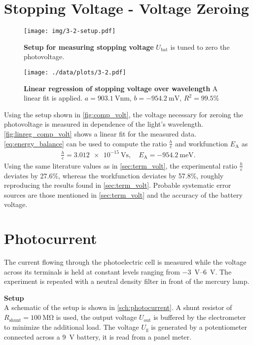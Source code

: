 \section{Stopping Voltage - Voltage Zeroing}%
\begin{figure}[tbp]
	\centering
	\texttt{[image: img/3-2-setup.pdf]}
	\caption[Setup for measuring stopping voltage]{\textbf{Setup for measuring stopping voltage} $U_\text{bat}$ is tuned to zero the photovoltage.}
	\label{fig:comp_volt}
\end{figure}
\begin{figure}[tbp]
	\centering
	\texttt{[image: ./data/plots/3-2.pdf]}
	\caption[Linear regression of stopping voltage over wavelength]{\textbf{Linear regression of stopping voltage over wavelength} A linear fit is applied. $a=\SI{903.1}{\volt\nm}$, $b=\SI{-954.2}{\milli\V}$, $R^2=99.5\%$}
	\label{fig:linreg_comp_volt}
\end{figure}
Using the setup shown in \autoref{fig:comp_volt}, the voltage necessary for zeroing the photovoltage is measured in dependence of the light's wavelength.
\autoref{fig:linreg_comp_volt} shows a linear fit for the measured data.
\autoref{eq:energy_balance} can be used to compute the ratio $\frac{h}{e}$ and workfunction $E_\text{A}$ as
\begin{gather*}
	\frac{h}{e}=\SI{3.012e-15}{\volt\second},\quad E_\text{A}=\SI{-954.2}{\milli\eV}.
\end{gather*}
Using the same literature values as in \autoref{sec:term_volt}, the experimental ratio $\frac{h}{e}$ deviates by \num{27.6}\%, whereas the workfunction deviates by \num{57.8}\%, roughly reproducing the results found in \autoref{sec:term_volt}.
Probable systematic error sources are those mentioned in \autoref{sec:term_volt} and the accuracy of the battery voltage.

\section{Photocurrent}\label{sec:photo_current}%

The current flowing through the photoelectric cell is measured while the voltage across its terminals is held at constant levels ranging from \SIrange{-3}{6}{\volt}.
The experiment is repeated with a neutral density filter in front of the mercury lamp.

\textbf{Setup}\\
A schematic of the setup is shown in \autoref{sch:photocurrent}.
A shunt resistor of $R_\text{shunt} = \SI{100}{\mega\ohm}$ is used, the output voltage $U_\text{out}$ is buffered by the electrometer to minimize the additional load.
The voltage $U_\text{g}$ is generated by a potentiometer connected across a \SI{9}{\volt} battery, it is read from a panel meter.

